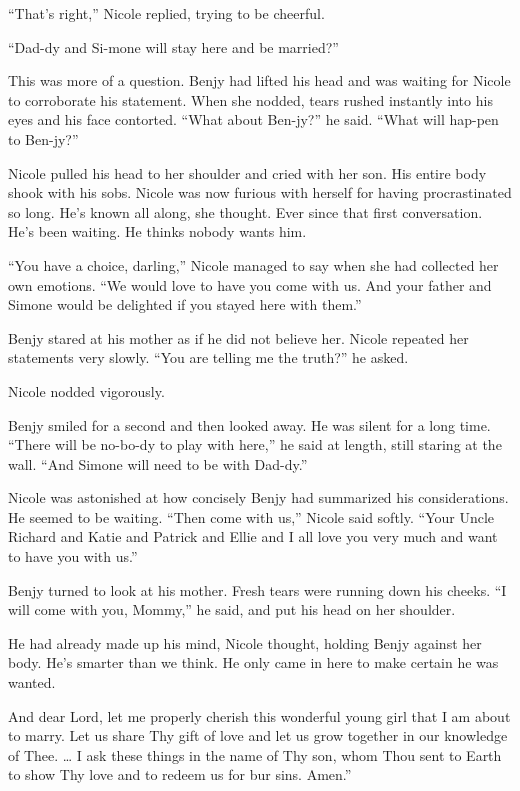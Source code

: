 \documentclass[]{article}
\begin{document}
{“That’s right,” Nicole replied, trying to be cheerful.

“Dad-dy and Si-mone will stay here and be married?”

This was more of a question.  Benjy had lifted his head and was waiting for Nicole to corroborate his statement.  When she nodded, tears rushed instantly into his eyes and his face contorted.  “What about Ben-jy?” he said.  “What will hap-pen to Ben-jy?”

Nicole pulled his head to her shoulder and cried with her son.  His entire body shook with his sobs.  Nicole was now furious with herself for having procrastinated so long.  He’s known all along, she thought.  Ever since that first conversation.  He’s been waiting.  He thinks nobody wants him.

“You have a choice, darling,” Nicole managed to say when she had collected her own emotions.  “We would love to have you come with us.  And your father and Simone would be delighted if you stayed here with them.”

Benjy stared at his mother as if he did not believe her.  Nicole repeated her statements very slowly.  “You are telling me the truth?” he asked.

Nicole nodded vigorously.

Benjy smiled for a second and then looked away.  He was silent for a long time.  “There will be no-bo-dy to play with here,” he said at length, still staring at the wall.  “And Simone will need to be with Dad-dy.”

Nicole was astonished at how concisely Benjy had summarized his considerations.  He seemed to be waiting.  “Then come with us,” Nicole said softly.  “Your Uncle Richard and Katie and Patrick and Ellie and I all love you very much and want to have you with us.”

Benjy turned to look at his mother.  Fresh tears were running down his cheeks.  “I will come with you, Mommy,” he said, and put his head on her shoulder.

He had already made up his mind, Nicole thought, holding Benjy against her body.  He’s smarter than we think.  He only came in here to make certain he was wanted.

And dear Lord, let me properly cherish this wonderful young girl that I am about to marry.  Let us share Thy gift of love and let us grow together in our knowledge of Thee.  … I ask these things in the name of Thy son, whom Thou sent to Earth to show Thy love and to redeem us for bur sins.  Amen.”

}
\end{document}
